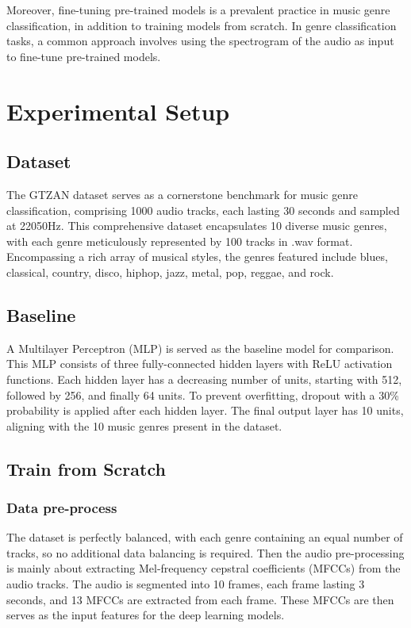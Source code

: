 \documentclass{article}
\begin{document}
Moreover, fine-tuning pre-trained models is a prevalent practice in music genre classification, in addition to training models from scratch. In genre classification tasks, a common approach involves using the spectrogram of the audio as input to fine-tune pre-trained models.


\section{Experimental Setup}
\subsection{Dataset}
The GTZAN dataset serves as a cornerstone benchmark for music genre classification, comprising 1000 audio tracks, each lasting 30 seconds and sampled at 22050Hz. This comprehensive dataset encapsulates 10 diverse music genres, with each genre meticulously represented by 100 tracks in .wav format. Encompassing a rich array of musical styles, the genres featured include blues, classical, country, disco, hiphop, jazz, metal, pop, reggae, and rock.

\subsection{Baseline}
A Multilayer Perceptron (MLP) is served as the baseline model for comparison.
This MLP consists of three fully-connected hidden layers with ReLU activation functions. 
Each hidden layer has a decreasing number of units, starting with 512, followed by 256, and finally 64 units. 
To prevent overfitting, dropout with a 30\% probability is applied after each hidden layer. 
The final output layer has 10 units, aligning with the 10 music genres present in the dataset.

\subsection{Train from Scratch}

\subsubsection{Data pre-process}
The dataset is perfectly balanced, with each genre containing an equal number of tracks, so no additional data balancing is required.
Then the audio pre-processing is mainly about extracting Mel-frequency cepstral coefficients (MFCCs) from the audio tracks.
The audio is segmented into 10 frames, each frame lasting 3 seconds, and 13 MFCCs are extracted from each frame.
These MFCCs are then serves as the input features for the deep learning models.
\end{document}
